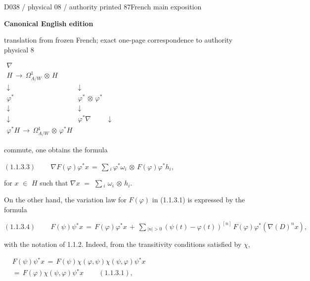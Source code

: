 \documentclass[9pt]{article}
\newcommand{\CanonText}[1]{\par{\fontsize{8.0}{9.35}\selectfont\RaggedRight #1\par}\vspace{2.2pt}}
\newcommand{\CanonDisplay}[1]{\par\vspace{1.2pt}\begin{center}{\fontsize{7.2}{8.4}\selectfont\(\displaystyle #1\)}\end{center}\vspace{1.2pt}}
\newenvironment{CanonMathBlock}{\par\vspace{1.2pt}\begin{center}\fontsize{6.8}{8.0}\selectfont\(\displaystyle}{\)\end{center}\vspace{1.2pt}}
\newcommand{\LayerTitle}{Canonical English edition}
\begin{document}
\noindent\begin{minipage}[t][\dimexpr\textheight-5pt\relax][t]{\textwidth}
{\sffamily\fontsize{7.3}{8.2}\selectfont\color{Quiet} D038 / physical 08 / authority printed 87\hfill French main exposition}
\par{}\vspace{4.5pt}
{\sffamily\fontsize{10.4}{11.6}\selectfont\bfseries\color{Accent} \LayerTitle}
\par{\sffamily\fontsize{6.7}{7.7}\selectfont\color{Quiet} translation from frozen French; exact one-page correspondence to authority physical 8}
\vspace{5pt}
\begin{CanonMathBlock}
\begin{array}{ccc}
\nabla{} & {} & {}\\
H\,\longrightarrow{}\,\Omega{}^{1}_{A/W}\,\otimes{}\,H & {} & {}\\
\downarrow{} & \downarrow{} & {}\\
\varphi{}^{*} & \varphi{}^{*}\,\otimes{}\,\varphi{}^{*} & {}\\
\downarrow{} & \downarrow{} & {}\\
\downarrow{} & \varphi{}^{*}\nabla{} & \downarrow{}\\
\varphi{}^{*}H\,\longrightarrow{}\,\Omega{}^{1}_{A/W}\,\otimes{}\,\varphi{}^{*}H & {} & {}
\end{array}
\end{CanonMathBlock}
\CanonText{commute, one obtains the formula}
\CanonDisplay{(1.1.3.3)\qquad\,\nabla{}F(\varphi{})\varphi{}^{*}x\,=\,\sum{}_{i}\,\varphi{}^{*}\omega{}_{i}\,\otimes{}\,F(\varphi{})\varphi{}^{*}h_{i},}
\CanonText{for \(x\) \(\in{}\) \(H\) such that \(\nabla{}x\) \(=\) \(\sum{}_{i}\) \(\omega{}_{i}\) \(\otimes{}\) \(h_{i}\).}
\CanonText{On the other hand, the variation law for \(F(\varphi{})\) in (1.1.3.1) is expressed by the formula}
\CanonDisplay{(1.1.3.4)\qquad\,F(\psi{})\psi{}^{*}x\,=\,F(\varphi{})\varphi{}^{*}x\,+\,\sum{}_{|n|>0}\,(\psi{}(t)-\varphi{}(t))^{[n]}\,F(\varphi{})\varphi{}^{*}(\nabla{}(D)^{n}x),}
\CanonText{with the notation of 1.1.2. Indeed, from the transitivity conditions satisfied by \(\chi{}\),}
\begin{CanonMathBlock}
\begin{aligned}
& F(\psi{})\psi{}^{*}x\,=\,F(\psi{})\chi{}(\varphi{},\psi{})\chi{}(\psi{},\varphi{})\psi{}^{*}x\\
& =\,F(\varphi{})\chi{}(\psi{},\varphi{})\psi{}^{*}x\qquad\,(1.1.3.1),

\end{aligned}
\end{CanonMathBlock}
\end{minipage}
\end{document}
